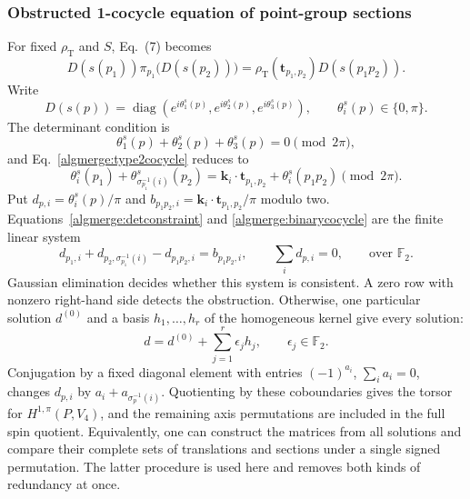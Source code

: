 \subsubsection{Obstructed 1-cocycle equation of point-group sections}

For fixed $\rho_{\mathrm T}$ and $S$, Eq.~(7) becomes
\begin{equation}
 D(s(p_1))\pi_{p_1}\bigl(D(s(p_2))\bigr)
 =\rho_{\mathrm T}(\bm t_{p_1,p_2})D(s(p_1p_2)).
 \tag{35}\label{algmerge:type2cocycle}
\end{equation}
Write
\begin{equation}
 D(s(p))=\operatorname{diag}(e^{i\theta_1^s(p)},e^{i\theta_2^s(p)},
 e^{i\theta_3^s(p)}),\qquad\theta_i^s(p)\in\{0,\pi\}.
 \tag{36}\label{algmerge:binaryphases}
\end{equation}
The determinant condition is
\begin{equation}
 \theta_1^s(p)+\theta_2^s(p)+\theta_3^s(p)=0\pmod{2\pi},
 \tag{37}\label{algmerge:detconstraint}
\end{equation}
and Eq.~\eqref{algmerge:type2cocycle} reduces to
\begin{equation}
 \theta_i^s(p_1)+\theta_{\sigma_{p_1}^{-1}(i)}^s(p_2)
 =\bm k_i\cdot\bm t_{p_1,p_2}+\theta_i^s(p_1p_2)\pmod{2\pi}.
 \tag{38}\label{algmerge:binarycocycle}
\end{equation}
Put $d_{p,i}=\theta_i^s(p)/\pi$ and
$b_{p_1p_2,i}=\bm k_i\cdot\bm t_{p_1,p_2}/\pi$ modulo two.
Equations~\eqref{algmerge:detconstraint} and
\eqref{algmerge:binarycocycle} are the finite linear system
\begin{equation}
 d_{p_1,i}+d_{p_2,\sigma_{p_1}^{-1}(i)}-d_{p_1p_2,i}
 =b_{p_1p_2,i},\qquad \sum_i d_{p,i}=0,
 \qquad\text{over }\mathbb F_2.
 \tag{38a}\label{algmerge:binarysystem}
\end{equation}
Gaussian elimination decides whether this system is consistent.
A zero row with nonzero right-hand side detects the obstruction.
Otherwise, one particular solution $d^{(0)}$ and a basis
$h_1,\ldots,h_r$ of the homogeneous kernel give every solution:
\begin{equation}
 d=d^{(0)}+\sum_{j=1}^r\epsilon_j h_j,
 \qquad\epsilon_j\in\mathbb F_2.
 \tag{38b}\label{algmerge:binarysolutions}
\end{equation}
Conjugation by a fixed diagonal element with entries $(-1)^{a_i}$,
$\sum_i a_i=0$, changes
$d_{p,i}$ by $a_i+a_{\sigma_p^{-1}(i)}$. Quotienting by these
coboundaries gives the torsor for $H^{1,\pi}(P,V_4)$, and the
remaining axis permutations are included in the full spin quotient.
Equivalently, one can construct the matrices from all solutions and
compare their complete sets of translations and sections under a
single signed permutation. The latter procedure is used here and
removes both kinds of redundancy at once.

